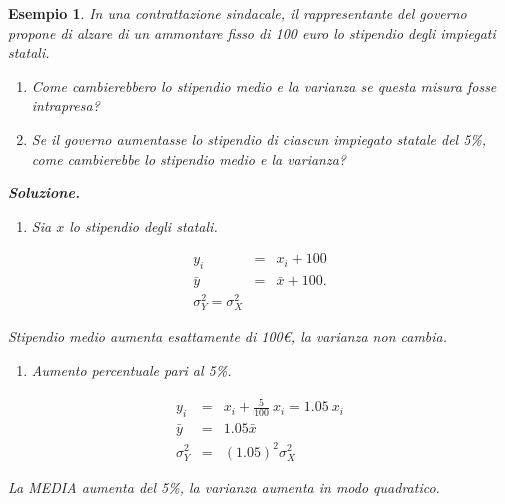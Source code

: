 \documentclass[
  11pt,
]{book}
\providecommand{\tightlist}{%
  \setlength{\itemsep}{0pt}\setlength{\parskip}{0pt}}
\theoremstyle{mytheoremstyle}
\theoremstyle{mydefstyle}
\newtheorem{example}{{Esempio}}[section]
\begin{document}
\begin{example}
In una contrattazione sindacale, il rappresentante
del governo propone di alzare di un ammontare fisso di 100 euro
lo stipendio degli impiegati statali.

\begin{enumerate}
\def\labelenumi{\alph{enumi}.}
\item
  Come cambierebbero lo stipendio medio e la varianza se questa misura fosse
  intrapresa?
\item
  Se il governo aumentasse lo stipendio di ciascun
  impiegato statale del 5\%, come cambierebbe lo stipendio medio e la varianza?
\end{enumerate}

\textbf{Soluzione.}

\begin{enumerate}
\def\labelenumi{\alph{enumi}.}
\tightlist
\item
  Sia \(x\) lo stipendio degli statali.
\end{enumerate}

\begin{eqnarray*}
y_{i}   &=& x_{i} + 100   \\
\bar{y} &=& \bar{x} + 100   .\\
\sigma_Y^2=\sigma_X^2
\end{eqnarray*}

Stipendio medio aumenta esattamente di 100\euro, la varianza non cambia.

\begin{enumerate}
\def\labelenumi{\alph{enumi}.}
\setcounter{enumi}{1}
\tightlist
\item
  Aumento percentuale pari al 5\%.
\end{enumerate}

\begin{eqnarray*}
y_{i}   &=& x_{i} + \frac{5} {100}\ x_{i} = 1.05\ x_{i}  \\
\bar{y} &=& 1.05 \bar{x}  \\
\sigma_Y^2 &=& (1.05)^2\sigma_X^2
\end{eqnarray*}

La MEDIA aumenta del 5\%, la varianza aumenta in modo quadratico.
\end{example}
\end{document}
